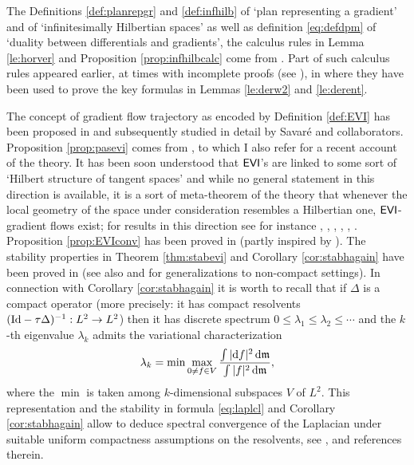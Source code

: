 \documentclass[11pt]{article}
\numberwithin{equation}{section}
\newcommand{\mm}{{\mathfrak m}}
\renewcommand{\d}{{\rm d}}
\newcommand{\Id}{{\rm Id}}
\newcommand{\EVI}{{\sf EVI}}
\begin{document}
{{The Definitions \ref{def:planrepgr} and \ref{def:infhilb} of `plan representing a gradient' and of `infinitesimally Hilbertian spaces' as well as definition \eqref{eq:defdpm} of `duality between differentials and gradients', the calculus rules in Lemma \ref{le:horver} and Proposition \ref{prop:infhilbcalc} come from \cite{Gigli12}. Part of such calculus rules appeared earlier, at times with incomplete proofs (see \cite[Lemma 4.7 and the comments before it]{AmbrosioGigliSavare11-2}), in \cite{AmbrosioGigliSavare11-2} where they have been used to prove the key formulas in Lemmas \ref{le:derw2} and \ref{le:derent}.


The concept of gradient flow trajectory as encoded by Definition \ref{def:EVI} has been proposed in \cite{AmbrosioGigliSavare08}  and subsequently studied in detail by Savar\'e and collaborators. Proposition \ref{prop:pasevi} comes from \cite{MS20}, to which I also refer for a recent account of the theory. It has been soon understood that $\EVI$'s are linked to some sort of `Hilbert structure of tangent spaces' and while no general statement in this direction is available, it is a sort of meta-theorem of the theory that whenever the local geometry of the space under consideration resembles a Hilbertian one, $\EVI$-gradient flows exist; for results in this direction see for instance \cite{OhSt09},  \cite{OhSt12}, \cite{vRT12}, \cite{Gigli13},  \cite{OhPa17},  \cite{MS20}. Proposition \ref{prop:EVIconv} has been proved in \cite{DaneriSavare08} (partly inspired by \cite{OtWe05}). The stability properties in Theorem \ref{thm:stabevi} and Corollary \ref{cor:stabhagain} have been proved in \cite{AmbrosioGigliSavare11-2} (see also \cite{GMS15} and \cite{MS20} for generalizations to non-compact settings). In connection with Corollary \ref{cor:stabhagain} it is worth to recall that if $\Delta$ is a compact operator (more precisely: it has compact resolvents $(\Id-\tau\Delta)^{-1}:L^2\to L^2$) then it has discrete spectrum $0\leq \lambda_1\leq\lambda_2\leq\cdots$ and the $k$-th eigenvalue $\lambda_k$ admits the variational characterization
\[
\lambda_k=\min_{}\max_{0\neq f\in V}\frac{\int|\d f|^2\,\d\mm}{\int |f|^2\,\d\mm},
\]
where the $\min$ is taken among $k$-dimensional subspaces $V$ of $L^2$. This representation and the stability in formula \eqref{eq:laplcl} and Corollary \ref{cor:stabhagain} allow to deduce spectral convergence of the Laplacian under suitable uniform compactness assumptions on the resolvents, see \cite[Sections 2.6, 2.7]{KS03conv},  \cite[Theorem 7.8]{GMS15} and references therein.

}}
\end{document}
